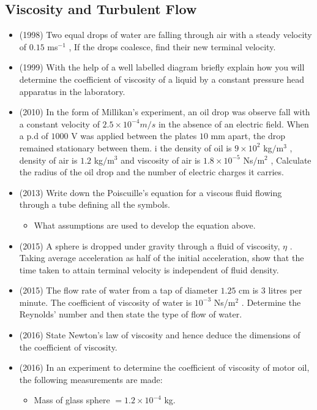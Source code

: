 \documentclass{article}
\begin{document}
\subsection{Viscosity and Turbulent Flow}
\begin{itemize}
\item (1998)  Two equal drops of water are falling through air with a steady velocity of $ 0.15$ ms$ ^{-1}$ , If the drops coalesce, find their new terminal velocity.
\item (1999)  With the help of a well labelled diagram briefly explain how you will determine the coefficient of viscosity of a liquid by a constant pressure head apparatus in the laboratory.
\item (2010)  In the form of Millikan’s experiment, an oil drop was observe fall with a constant velocity of $ 2.5	\times 10^{-4}m/s$ in the absence of an electric field. When a p.d of $ 1000$ V was applied between the plates $ 10$ mm apart, the drop remained stationary between them. i the density of oil is $ 9 \times 10^{2}$ kg$/$m$ ^{3}$ , density of air is $ 1.2$ kg$/$m$ ^{3}$ and viscosity of air is $ 1.8\times 10^{-5}$ Ns$/$m$ ^{2}$ , Calculate the radius of the oil drop and the number of electric charges it carries.
\item (2013)  Write down the Poiscuille’s equation for a viscous fluid flowing through a tube defining all the symbols.
 \begin{itemize}
\item What assumptions are used to develop the equation above. 
\end{itemize}
\item (2015)  A sphere is dropped under gravity through a fluid of viscosity, $ \eta $ .  Taking average acceleration as half of the initial acceleration, show that the time taken to attain terminal velocity is independent of fluid density.
\item (2015)  The flow rate of water from a tap of diameter $ 1.25$ cm is $ 3$ litres per minute.  The coefficient of viscosity of water is $ 10^{-3}$ Ns/m$ ^{2}$ .  Determine the Reynolds’ number and then state the type of flow of water.
\item (2016)  State Newton’s law of viscosity and hence deduce the dimensions of the coefficient of viscosity.
\item (2016)  In an experiment to determine the coefficient of viscosity of motor oil, the following measurements are made:
 \begin{itemize}
\item Mass of glass sphere $ =1.2 \times 10^{-4}$ kg.

\end{itemize}
\end{itemize}
\end{document}
